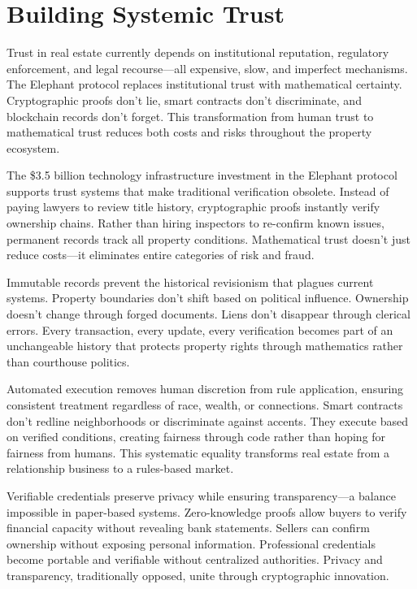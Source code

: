 \section{Building Systemic Trust}

Trust in real estate currently depends on institutional reputation, regulatory enforcement, and legal recourse—all expensive, slow, and imperfect mechanisms. The Elephant protocol replaces institutional trust with mathematical certainty. Cryptographic proofs don't lie, smart contracts don't discriminate, and blockchain records don't forget. This transformation from human trust to mathematical trust reduces both costs and risks throughout the property ecosystem.

The \$3.5 billion technology infrastructure investment in the Elephant protocol supports trust systems that make traditional verification obsolete. Instead of paying lawyers to review title history, cryptographic proofs instantly verify ownership chains. Rather than hiring inspectors to re-confirm known issues, permanent records track all property conditions. Mathematical trust doesn't just reduce costs—it eliminates entire categories of risk and fraud.

Immutable records prevent the historical revisionism that plagues current systems. Property boundaries don't shift based on political influence. Ownership doesn't change through forged documents. Liens don't disappear through clerical errors. Every transaction, every update, every verification becomes part of an unchangeable history that protects property rights through mathematics rather than courthouse politics.

Automated execution removes human discretion from rule application, ensuring consistent treatment regardless of race, wealth, or connections. Smart contracts don't redline neighborhoods or discriminate against accents. They execute based on verified conditions, creating fairness through code rather than hoping for fairness from humans. This systematic equality transforms real estate from a relationship business to a rules-based market.

Verifiable credentials preserve privacy while ensuring transparency—a balance impossible in paper-based systems. Zero-knowledge proofs allow buyers to verify financial capacity without revealing bank statements. Sellers can confirm ownership without exposing personal information. Professional credentials become portable and verifiable without centralized authorities. Privacy and transparency, traditionally opposed, unite through cryptographic innovation.

